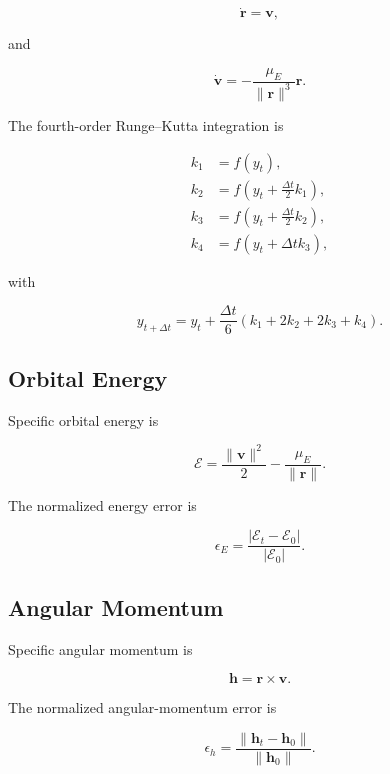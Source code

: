 \documentclass[11pt,a4paper]{article}
\newcommand{\vect}[1]{\bm{#1}}
\begin{document}
\begin{equation}
\dot{\vect r}
=
\vect v,
\end{equation}

and

\begin{equation}
\dot{\vect v}
=
-\frac{\mu_E}
{\|\vect r\|^3}
\vect r.
\end{equation}

The fourth-order Runge--Kutta integration is

\begin{align}
k_1
&=
f(y_t),\\
k_2
&=
f
\left(
y_t+\frac{\Delta t}{2}k_1
\right),\\
k_3
&=
f
\left(
y_t+\frac{\Delta t}{2}k_2
\right),\\
k_4
&=
f
\left(
y_t+\Delta t k_3
\right),
\end{align}

with

\begin{equation}
y_{t+\Delta t}
=
y_t+
\frac{\Delta t}{6}
(k_1+2k_2+2k_3+k_4).
\end{equation}

\subsection{Orbital Energy}

Specific orbital energy is

\begin{equation}
\mathcal E
=
\frac{\|\vect v\|^2}{2}
-
\frac{\mu_E}{\|\vect r\|}.
\end{equation}

The normalized energy error is

\begin{equation}
\epsilon_E
=
\frac{
|\mathcal E_t-\mathcal E_0|
}{
|\mathcal E_0|
}.
\end{equation}

\subsection{Angular Momentum}

Specific angular momentum is

\begin{equation}
\vect h
=
\vect r\times\vect v.
\end{equation}

The normalized angular-momentum error is

\begin{equation}
\epsilon_h
=
\frac{
\|\vect h_t-\vect h_0\|
}{
\|\vect h_0\|
}.
\end{equation}
\end{document}
